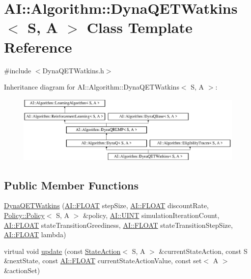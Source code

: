 \hypertarget{classAI_1_1Algorithm_1_1DynaQETWatkins}{\section{A\-I\-:\-:Algorithm\-:\-:Dyna\-Q\-E\-T\-Watkins$<$ S, A $>$ Class Template Reference}
\label{classAI_1_1Algorithm_1_1DynaQETWatkins}
}


{\ttfamily \#include $<$Dyna\-Q\-E\-T\-Watkins.\-h$>$}

Inheritance diagram for A\-I\-:\-:Algorithm\-:\-:Dyna\-Q\-E\-T\-Watkins$<$ S, A $>$\-:\begin{figure}[H]
\begin{center}
\leavevmode
\includegraphics[height=3.357314cm]{classAI_1_1Algorithm_1_1DynaQETWatkins}
\end{center}
\end{figure}
\subsection*{Public Member Functions}
\begin{DoxyCompactItemize}
\item 
\hyperlink{classAI_1_1Algorithm_1_1DynaQETWatkins_a0601ab5adb8ba7d0d94d93b6194528c9}{Dyna\-Q\-E\-T\-Watkins} (\hyperlink{namespaceAI_a41b74884a20833db653dded3918e05c3}{A\-I\-::\-F\-L\-O\-A\-T} step\-Size, \hyperlink{namespaceAI_a41b74884a20833db653dded3918e05c3}{A\-I\-::\-F\-L\-O\-A\-T} discount\-Rate, \hyperlink{classAI_1_1Algorithm_1_1Policy_1_1Policy}{Policy\-::\-Policy}$<$ S, A $>$ \&policy, \hyperlink{namespaceAI_ab6e14dc1e659854858a87e511f1439ec}{A\-I\-::\-U\-I\-N\-T} simulation\-Iteration\-Count, \hyperlink{namespaceAI_a41b74884a20833db653dded3918e05c3}{A\-I\-::\-F\-L\-O\-A\-T} state\-Transition\-Greediness, \hyperlink{namespaceAI_a41b74884a20833db653dded3918e05c3}{A\-I\-::\-F\-L\-O\-A\-T} state\-Transition\-Step\-Size, \hyperlink{namespaceAI_a41b74884a20833db653dded3918e05c3}{A\-I\-::\-F\-L\-O\-A\-T} lambda)
\item 
virtual void \hyperlink{classAI_1_1Algorithm_1_1DynaQETWatkins_aa4e40af0fd705cd5d1f7fd13834c57c6}{update} (const \hyperlink{classAI_1_1StateAction}{State\-Action}$<$ S, A $>$ \&current\-State\-Action, const S \&next\-State, const \hyperlink{namespaceAI_a41b74884a20833db653dded3918e05c3}{A\-I\-::\-F\-L\-O\-A\-T} current\-State\-Action\-Value, const set$<$ A $>$ \&action\-Set)
\end{DoxyCompactItemize}
